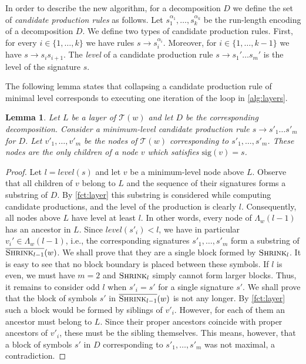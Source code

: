 \documentclass[a4paper]{article}
\newtheorem{lemma}[theorem]{Lemma}
\theoremstyle{remark}
\newcommand{\shrink}[1]{\ensuremath{\textsc{Shrink}_{#1}}}
\newcommand{\cshrink}[1]{\ensuremath{\overline{\textsc{Shrink}_{#1}}}}
\newcommand{\decomp}{D}
\newcommand{\slev}{\textit{level}}
\newcommand{\stree}{\mathcal{T}}
\newcommand{\ussig}{\mathrm{sig}}
\newcommand{\stlayer}{\Lambda}
\begin{document}
In order to describe the new algorithm, for a decomposition $\decomp$ we define the set of \emph{candidate production rules} as follows.
Let $s_1^{\alpha_1},\ldots, s_k^{\alpha_k}$ be the run-length encoding of a decomposition $\decomp$.
We define two types of candidate production rules.
First, for every $i \in \{1, \ldots, k\}$ we have rules $s \rightarrow s_i^{\alpha_i}$.
Moreover, for $i \in \{1, \ldots, k-1\}$ we have $s \rightarrow s_is_{i+1}$.
The \emph{level} of a candidate production rule $s \rightarrow s_1'\ldots s_m'$ is the level of the signature $s$.

The following lemma states that collapsing a candidate production rule of minimal level corresponds to executing one iteration of the loop in \cref{alg:layers}.
\begin{lemma}\label{lem:cpr}
Let $L$ be a layer of $\stree(w)$ and let $D$ be the corresponding decomposition.
Consider a minimum-level candidate production rule $s \rightarrow s'_1\ldots s'_m$ for $\decomp$.
Let $v'_1,\ldots,v'_m$ be the nodes of $\stree(w)$ corresponding to $s'_1,\ldots,s'_m$.
These nodes are the only children of a node $v$ which satisfies $\ussig(v)=s$.
\end{lemma}
\begin{proof}
Let $l = \slev(s)$ and let $v$ be a minimum-level node above $L$.
Observe that all children of $v$ belong to $L$ and the sequence of their signatures forms a substring of $D$.
By \cref{fct:layer} this substring is considered while computing candidate productions, and the level of the production
is clearly $l$.
Consequently, all nodes above $L$ have level at least $l$.
In other words, every node of $\stlayer_w(l-1)$ has an ancestor in $L$.
Since $\slev(s'_i)<l$, we have in particular $v_i'\in \stlayer_w(l-1)$,
i.e., the corresponding signatures $s'_1,\ldots,s'_m$ form a substring of $\cshrink{l-1}(w)$.
We shall prove that they are a single block formed by $\shrink{l}$.
It is easy to see that no block boundary is placed between these symbols.
If $l$ is even, we must have $m=2$ and $\shrink{l}$ simply cannot form larger blocks.
Thus, it remains to consider odd $l$ when $s'_i=s'$ for a single signature $s'$.
We shall prove that the block of symbols $s'$ in $\cshrink{l-1}(w)$ is not any longer. By \cref{fct:layer}
such a block would be formed by siblings of $v'_i$. However, for each of them an ancestor must belong to $L$.
Since their proper ancestors coincide with proper ancestors of $v'_i$, these must be the sibling themselves.
This means, however, that a block of symbols $s'$ in $D$ corresponding to $s'_1,\ldots,s'_m$ was not maximal,
a contradiction.
\end{proof}
\end{document}
